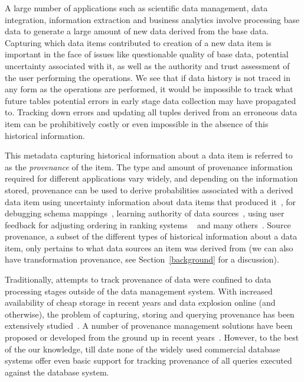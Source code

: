 
A large number of applications such as scientific data management, data integration, information extraction and business analytics involve processing base data to generate a large amount of new data derived from the base data. Capturing which data items contributed to creation of a new data item is important in the face of issues like questionable quality of base data, potential uncertainty associated with it, as well as the authority and trust assessment of the user performing the operations. We see that if data history is not traced in any form as the operations are performed, it would be impossible to track what future tables potential errors in early stage data collection may have propagated to. Tracking down errors and updating all tuples derived from an erroneous data item can be prohibitively costly or even impossible in the absence of this historical information.

This metadata capturing historical information about a data item is referred to as the \textit{provenance} of the item. The type and amount of provenance information required for different applications vary widely, and depending on the information stored, provenance can be used to derive probabilities associated with a derived data item using uncertainty information about data items that produced it~\cite{widom2005trio}, for debugging schema mappings~\cite{schema_vldb07}, learning authority of data sources~\cite{schema_vldb07}, using user feedback for adjusting ordering in ranking systems ~\cite{integration_vldb08} and many others~\cite{simmhan05asurvey}. Source provenance, a subset of the different types of historical information about a data item, only pertains to what data sources an item was derived from (we can also have transformation provenance, see Section~\ref{background} for a discussion).

Traditionally, attempts to track provenance of data were confined to data processing stages outside of the data management system. With increased availability of cheap storage in recent years and data explosion online (and otherwise), the problem of capturing, storing and querying provenance has been extensively studied~\cite{glavic_dataprovenance, ikeda2010panda, dataspace_halevy}. A number of provenance management solutions have been proposed or developed from the ground up in recent years~\cite{sarma2010live, stonebraker9requirements, widom2005trio, lineage_stanford, chimera_2002, preserv_prov, dbnotes_sig05}. However, to the best of the our knowledge, till date none of the widely used commercial database systems offer even basic support for tracking provenance of all queries executed against the database system. 

